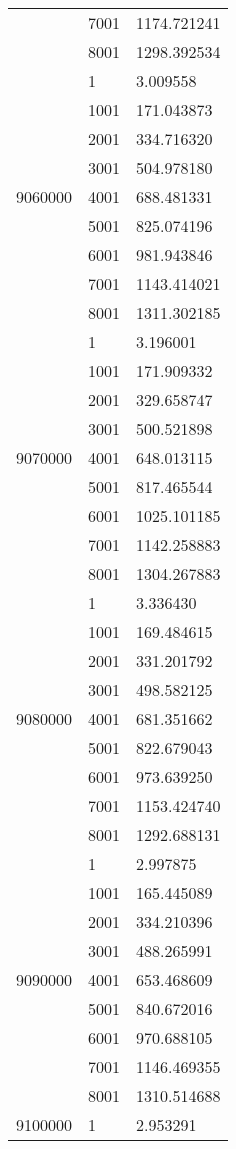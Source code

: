 \begin{table}[htb!]
\begin{tabular}{lll}
 & 7001 & 1174.721241 \\
 & 8001 & 1298.392534 \\
\multirow[c]{9}{*}{9060000} & 1 & 3.009558 \\
 & 1001 & 171.043873 \\
 & 2001 & 334.716320 \\
 & 3001 & 504.978180 \\
 & 4001 & 688.481331 \\
 & 5001 & 825.074196 \\
 & 6001 & 981.943846 \\
 & 7001 & 1143.414021 \\
 & 8001 & 1311.302185 \\
\multirow[c]{9}{*}{9070000} & 1 & 3.196001 \\
 & 1001 & 171.909332 \\
 & 2001 & 329.658747 \\
 & 3001 & 500.521898 \\
 & 4001 & 648.013115 \\
 & 5001 & 817.465544 \\
 & 6001 & 1025.101185 \\
 & 7001 & 1142.258883 \\
 & 8001 & 1304.267883 \\
\multirow[c]{9}{*}{9080000} & 1 & 3.336430 \\
 & 1001 & 169.484615 \\
 & 2001 & 331.201792 \\
 & 3001 & 498.582125 \\
 & 4001 & 681.351662 \\
 & 5001 & 822.679043 \\
 & 6001 & 973.639250 \\
 & 7001 & 1153.424740 \\
 & 8001 & 1292.688131 \\
\multirow[c]{9}{*}{9090000} & 1 & 2.997875 \\
 & 1001 & 165.445089 \\
 & 2001 & 334.210396 \\
 & 3001 & 488.265991 \\
 & 4001 & 653.468609 \\
 & 5001 & 840.672016 \\
 & 6001 & 970.688105 \\
 & 7001 & 1146.469355 \\
 & 8001 & 1310.514688 \\
\multirow[c]{9}{*}{9100000} & 1 & 2.953291 \\

\end{tabular}
\end{table}
